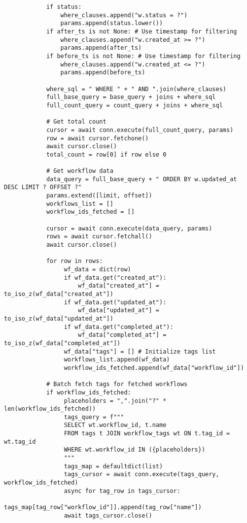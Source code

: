 \documentclass[12pt,a4paper]{article}
\begin{document}
\begin{pageablecode}
\begin{verbatim}
            if status:
                where_clauses.append("w.status = ?")
                params.append(status.lower())
            if after_ts is not None: # Use timestamp for filtering
                where_clauses.append("w.created_at >= ?")
                params.append(after_ts)
            if before_ts is not None: # Use timestamp for filtering
                where_clauses.append("w.created_at <= ?")
                params.append(before_ts)

            where_sql = " WHERE " + " AND ".join(where_clauses)
            full_base_query = base_query + joins + where_sql
            full_count_query = count_query + joins + where_sql

            # Get total count
            cursor = await conn.execute(full_count_query, params)
            row = await cursor.fetchone()
            await cursor.close()
            total_count = row[0] if row else 0

            # Get workflow data
            data_query = full_base_query + " ORDER BY w.updated_at DESC LIMIT ? OFFSET ?"
            params.extend([limit, offset])
            workflows_list = []
            workflow_ids_fetched = []

            cursor = await conn.execute(data_query, params)
            rows = await cursor.fetchall()
            await cursor.close()

            for row in rows:
                 wf_data = dict(row)
                 if wf_data.get("created_at"):
                     wf_data["created_at"] = to_iso_z(wf_data["created_at"])
                 if wf_data.get("updated_at"):
                     wf_data["updated_at"] = to_iso_z(wf_data["updated_at"])
                 if wf_data.get("completed_at"):
                     wf_data["completed_at"] = to_iso_z(wf_data["completed_at"])
                 wf_data["tags"] = [] # Initialize tags list
                 workflows_list.append(wf_data)
                 workflow_ids_fetched.append(wf_data["workflow_id"])

            # Batch fetch tags for fetched workflows
            if workflow_ids_fetched:
                 placeholders = ",".join("?" * len(workflow_ids_fetched))
                 tags_query = f"""
                 SELECT wt.workflow_id, t.name
                 FROM tags t JOIN workflow_tags wt ON t.tag_id = wt.tag_id
                 WHERE wt.workflow_id IN ({placeholders})
                 """
                 tags_map = defaultdict(list)
                 tags_cursor = await conn.execute(tags_query, workflow_ids_fetched)
                 async for tag_row in tags_cursor:
                      tags_map[tag_row["workflow_id"]].append(tag_row["name"])
                 await tags_cursor.close()


\end{verbatim}
\end{pageablecode}
\end{document}

